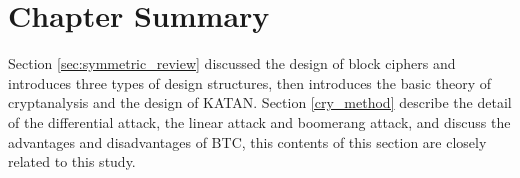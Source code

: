 \section{Chapter Summary}\label{sec:lit_summary}

Section \ref{sec:symmetric_review} discussed the design of block ciphers and introduces three types of design structures, then introduces the basic theory of cryptanalysis and the design of KATAN. Section \ref{cry_method} describe the detail of the differential attack, the linear attack and boomerang attack, and discuss the advantages and disadvantages of BTC, this contents of this section are closely related to this study.